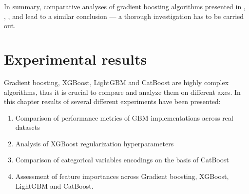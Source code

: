 \documentclass[magisterska, english]{pwr_wmat_praca_dyplomowa}
\theoremstyle{plain}
\numberwithin{theorem}{chapter}
\theoremstyle{definition}
\numberwithin{theorem}{chapter}
\begin{document}
In summary, comparative analyses of gradient boosting algorithms presented in \cite{lightgbm}, \cite{catboost}, \cite{comparative_analysis}, \cite{competitive_analysis} and \cite{comparison_of} lead to a similar conclusion --- a thorough investigation has to be carried out. 

\chapter{Experimental results}\label{chapter:results}
Gradient boosting, XGBoost, LightGBM and CatBoost are highly complex algorithms, thus it is crucial to compare and analyze them on different axes. In this chapter results of several different experiments have been presented:
\begin{enumerate}
    \item Comparison of performance metrics of GBM implementations across real datasets
    \item Analysis of XGBoost regularization hyperparameters
    \item Comparison of categorical variables encodings on the basis of CatBoost
    \item Assessment of feature importances across Gradient boosting, XGBoost, LightGBM and CatBoost. 
\end{enumerate}
\end{document}
